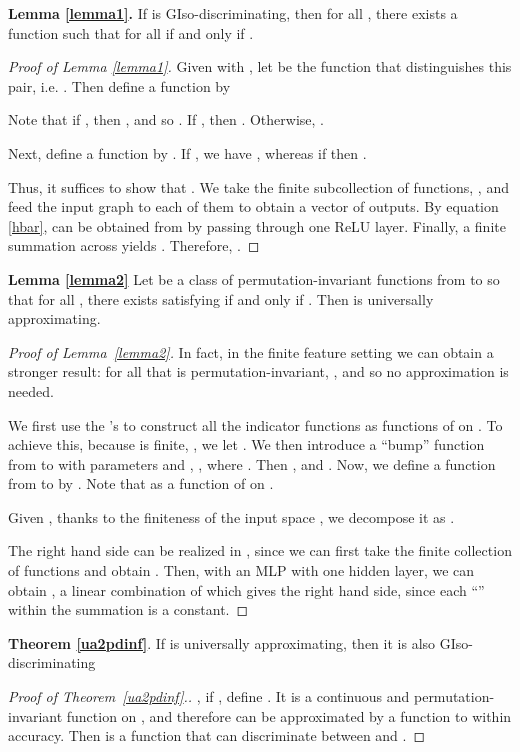 \documentclass{article}
\begin{document}
\textbf{Lemma \ref{lemma1}.} 
If  is GIso-discriminating, then for all , there exists a function  such that for all  if and only if .


\begin{proof}[Proof of Lemma \ref{lemma1}]
Given  with , let  be the function that distinguishes this pair, i.e. . Then define a function  by 


Note that if , then , and so . If , then . Otherwise, .

Next, define a function  by . If , we have , whereas if  then  .

Thus, it suffices to show that . We take the finite subcollection of functions, , and feed the input graph  to each of them to obtain a vector of outputs. By equation \ref{hbar},  can be obtained from  by passing through one ReLU layer. Finally, a finite summation across  yields . Therefore, .
\end{proof}

\textbf{Lemma \ref{lemma2}}
Let  be a class of permutation-invariant functions from  to  so that for all , there exists  satisfying  if and only if . 
Then   is universally approximating.

\begin{proof}[Proof of Lemma~\ref{lemma2}]
In fact, in the finite feature setting we can obtain a stronger result: for all  that is permutation-invariant, , and so no approximation is needed.

We first use the 's to construct all the indicator functions  as functions of  on . To achieve this, because  is finite, , we let . We then introduce a ``bump'' function from  to  with parameters  and , , where . Then , and . Now, we define a function  from  to  by . Note that  as a function of  on . 

Given , thanks to the finiteness of the input space , we decompose it as . 

The right hand side can be realized in , since we can first take the finite collection of functions  and obtain . Then, with an MLP with one hidden layer, we can obtain , a linear combination of which gives the right hand side, since each ``'' within the summation is a constant.
\end{proof}

\textbf{Theorem \ref{ua2pdinf}}.
If  is universally approximating, then it is also GIso-discriminating


\begin{proof}[Proof of Theorem~\ref{ua2pdinf}.]
, if , define . It is a continuous and permutation-invariant function on , and therefore can be approximated by a function  to within  accuracy. Then  is a function that can discriminate between  and .
\end{proof}
\end{document}
